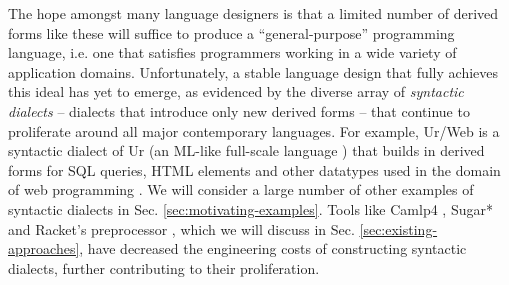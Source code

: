 The hope amongst many language designers is that a limited number of derived forms like these will suffice to produce a ``general-purpose'' programming language, i.e. one that satisfies programmers working in a wide variety of application domains. Unfortunately, a stable language design that fully achieves this ideal has yet to emerge, as evidenced by the diverse array of \emph{syntactic dialects} -- dialects that introduce only new derived forms -- that continue to proliferate around all major contemporary languages. For example, Ur/Web is a syntactic dialect of Ur (an ML-like full-scale language \cite{conf/pldi/Chlipala10}) that builds in derived forms for SQL queries, HTML elements and other datatypes used in the domain of web programming \cite{conf/popl/Chlipala15}. %
We will consider a large number of other examples of syntactic dialects in Sec. \ref{sec:motivating-examples}. 
Tools like Camlp4 \cite{ocaml-manual}, Sugar* \cite{erdweg2011sugarj,erdweg2013framework} and Racket's preprocessor \cite{Flatt:2012:CLR:2063176.2063195}, which we will discuss in Sec. \ref{sec:existing-approaches}, have decreased the engineering costs of constructing syntactic dialects, further contributing to their proliferation. 



